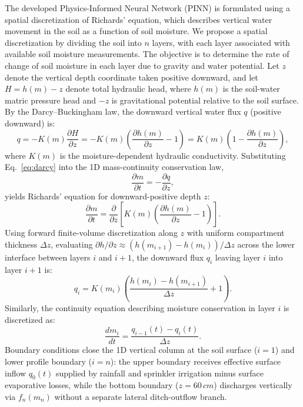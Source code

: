 \documentclass[pdflatex,sn-nature]{sn-jnl}%
\theoremstyle{thmstyleone}%
\theoremstyle{thmstyletwo}%
\theoremstyle{thmstylethree}%
\begin{document}
The developed Physics-Informed Neural Network (PINN) is formulated using a spatial discretization of Richards' equation, which describes vertical water movement in the soil as a function of soil moisture. We propose a spatial discretization by dividing the soil into $n$ layers, with each layer associated with available soil moisture measurements. The objective is to determine the rate of change of soil moisture in each layer due to gravity and water potential. Let $z$ denote the vertical depth coordinate taken positive downward, and let $H = h(m) - z$ denote total hydraulic head, where $h(m)$ is the soil-water matric pressure head and $-z$ is gravitational potential relative to the soil surface. By the Darcy--Buckingham law, the downward vertical water flux $q$ (positive downward) is:
\begin{equation}
q = -K(m)\frac{\partial H}{\partial z} = -K(m)\left(\frac{\partial h(m)}{\partial z} - 1\right) = K(m)\left(1 - \frac{\partial h(m)}{\partial z}\right),
\label{eq:darcy}
\end{equation}
where $K(m)$ is the moisture-dependent hydraulic conductivity. Substituting Eq.~\eqref{eq:darcy} into the 1D mass-continuity conservation law,
\begin{equation}
\frac{\partial m}{\partial t} = -\frac{\partial q}{\partial z},
\label{continuity}
\end{equation}
yields Richards' equation for downward-positive depth $z$:
\begin{equation}
\frac{\partial m}{\partial t} = \frac{\partial }{\partial z}\left[ K(m)\left(\frac{\partial h(m)}{\partial z} - 1\right)\right].
\label{Richards}
\end{equation}
Using forward finite-volume discretization along $z$ with uniform compartment thickness $\Delta z$, evaluating $\partial h/\partial z \approx (h(m_{i+1}) - h(m_i))/\Delta z$ across the lower interface between layers $i$ and $i+1$, the downward flux $q_i$ leaving layer $i$ into layer $i+1$ is:
\begin{equation}
q_i = K(m_i)\left(\frac{h(m_i)-h(m_{i+1})}{\Delta z}+1\right).
\label{eq:flux_disc}
\end{equation}
Similarly, the continuity equation describing moisture conservation in layer $i$ is discretized as:
\begin{equation}
\frac{d m_i}{d t} = \frac{q_{i-1}(t)-q_i(t)}{\Delta z}.
\label{eq:cont_disc}
\end{equation}
Boundary conditions close the 1D vertical column at the soil surface ($i=1$) and lower profile boundary ($i=n$): the upper boundary receives effective surface inflow $q_0(t)$ supplied by rainfall and sprinkler irrigation minus surface evaporative losses, while the bottom boundary ($z = 60\,\si{cm}$) discharges vertically via $f_n(m_n)$ without a separate lateral ditch-outflow branch.
\end{document}
